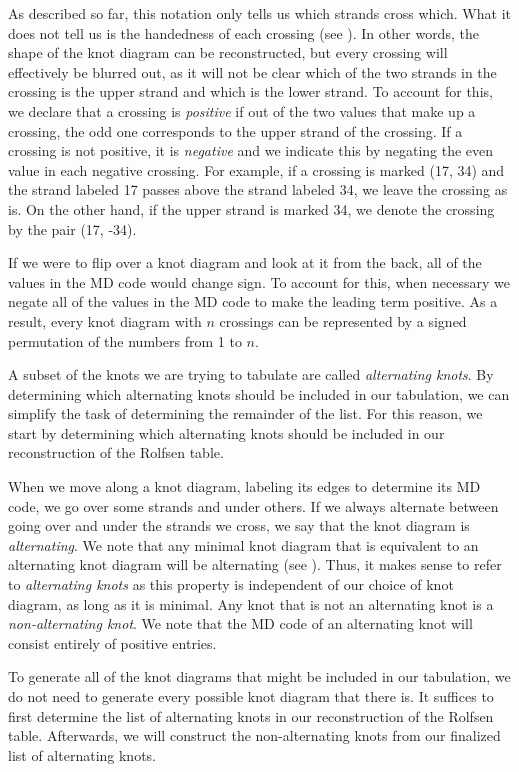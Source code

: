 \begin{paper}
As described so far, this notation only tells us which strands cross which.
What it does not tell us is the handedness of each crossing (see \figCrossings).
In other words, the shape of the knot diagram can be reconstructed, but every
crossing will effectively be blurred out, as it will not be clear which of the
two strands in the crossing is the upper strand and which is the lower strand.
To account for this, we declare that a crossing is \textit{positive} if out of
the two values that make up a crossing, the odd one corresponds to the upper
strand of the crossing.
If a crossing is not positive, it is \textit{negative} and we indicate this by
negating the even value in each negative crossing.
For example, if a crossing is marked (17, 34) and the strand labeled 17 passes
above the strand labeled 34, we leave the crossing as is.
On the other hand, if the upper strand is marked 34, we denote the crossing by
the pair (17, -34).

If we were to flip over a knot diagram and look at it from the back, all of the
values in the MD code would change sign.
To account for this, when necessary we negate all of the values in the MD code
to make the leading term positive.
As a result, every knot diagram with $n$ crossings can be represented by a
signed permutation of the numbers from 1 to $n$.


A subset of the knots we are trying to tabulate are called
\textit{alternating knots}.
By determining which alternating knots should be included in our tabulation, we
can simplify the task of determining the remainder of the list.
For this reason, we start by determining which alternating knots should be
included in our reconstruction of the Rolfsen table.

When we move along a knot diagram, labeling its edges to determine its MD code,
we go over some strands and under others.
If we always alternate between going over and under the strands we cross, we say
that the knot diagram is \textit{alternating}.
We note that any minimal knot diagram that is equivalent to an alternating knot
diagram will be alternating (see \cite{new}).
Thus, it makes sense to refer to \textit{alternating knots} as this property is
independent of our choice of knot diagram, as long as it is minimal.
Any knot that is not an alternating knot is a \textit{non-alternating knot}.
We note that the MD code of an alternating knot will consist entirely of
positive entries.

To generate all of the knot diagrams that might be included in our tabulation,
we do not need to generate every possible knot diagram that there is.
It suffices to first determine the list of alternating knots in our
reconstruction of the Rolfsen table.
Afterwards, we will construct the non-alternating knots from our finalized list
of alternating knots.


\end{paper}
